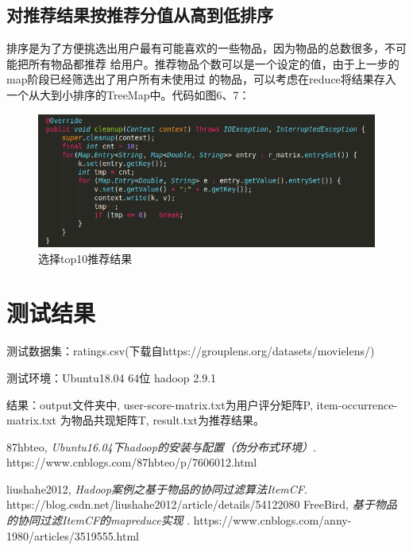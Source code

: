 \documentclass[12pt, a4paper]{article}
\begin{document}
\subsection{对推荐结果按推荐分值从高到低排序}
排序是为了方便挑选出用户最有可能喜欢的一些物品，因为物品的总数很多，不可能把所有物品都推荐
给用户。推荐物品个数可以是一个设定的值，由于上一步的map阶段已经筛选出了用户所有未使用过
的物品，可以考虑在reduce将结果存入一个从大到小排序的TreeMap中。代码如图6、7：
\begin{figure}[ht]
\centering
\includegraphics[scale=0.5]{recommend10.png}
\caption{选择top10推荐结果}
\end{figure}
\section{测试结果}
测试数据集：ratings.csv(下载自https://grouplens.org/datasets/movielens/)
\par 测试环境：Ubuntu18.04 64位 hadoop 2.9.1
\par 结果：output文件夹中, user-score-matrix.txt为用户评分矩阵P, item-occurrence-matrix.txt
为物品共现矩阵T, result.txt为推荐结果。

\begin{thebibliography}{9}
  87hbteo,
  \emph{Ubuntu16.04下hadoop的安装与配置（伪分布式环境）}.
  https://www.cnblogs.com/87hbteo/p/7606012.html

  liushahe2012,
  \emph{Hadoop案例之基于物品的协同过滤算法ItemCF}.
  https://blog.csdn.net/liushahe2012/article/details/54122080
  FreeBird,
  \emph{基于物品的协同过滤ItemCF的mapreduce实现 }.
  https://www.cnblogs.com/anny-1980/articles/3519555.html
\end{thebibliography}
\end{document}
